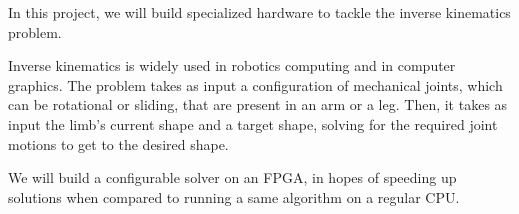In this project, we will build specialized hardware to tackle the inverse kinematics problem.

Inverse kinematics is widely used in robotics computing and in computer graphics. The problem takes as input a configuration of mechanical joints, which can be rotational or sliding, that are present in an arm or a leg. Then, it takes as input the limb's current shape and a target shape, solving for the required joint motions to get to the desired shape.

We will build a configurable solver on an FPGA, in hopes of speeding up solutions when compared to running a same algorithm on a regular CPU.